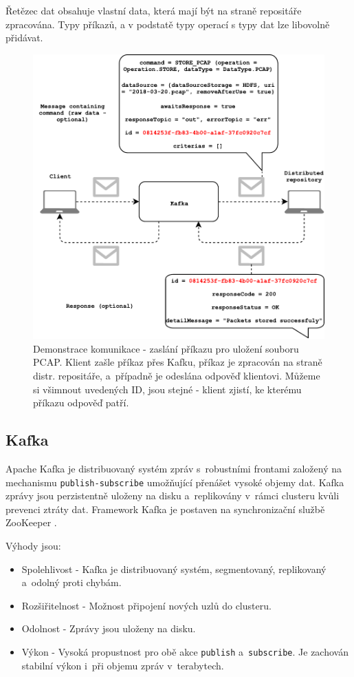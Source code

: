 \noindent Řetězec dat obsahuje vlastní data, která mají být na straně repositáře zpracována. Typy příkazů, a v podstatě typy operací s typy dat lze libovolně přidávat.

\begin{figure}[!h]
  \centering
  \includegraphics[width=14.1cm]{template-fig/Kafka_communication.pdf}
  \caption{Demonstrace komunikace - zaslání příkazu pro uložení souboru PCAP. Klient zašle příkaz přes Kafku, příkaz je zpracován na straně distr. repositáře, a~případně je odeslána odpověď klientovi. Můžeme si všimnout uvedených ID, jsou stejné - klient zjistí, ke kterému příkazu odpověď patří.}
  \label{FIG_KafkaCommunication}
\end{figure}

\subsection{Kafka}
Apache Kafka je distribuovaný systém zpráv s~robustními frontami založený na mechanismu \texttt{publish-subscribe} umožňující přenášet vysoké objemy dat. Kafka zprávy jsou perzistentně uloženy na disku a~replikovány v~rámci clusteru kvůli prevenci ztráty dat. Framework Kafka je postaven na synchronizační službě ZooKeeper \cite{kafkaTutorialsPoint}.

\vspace{0.5cm}
\noindent Výhody jsou:
\begin{itemize}
    \item Spolehlivost - Kafka je distribuovaný systém, segmentovaný, replikovaný a~odolný proti chybám.
    \item Rozšiřitelnost - Možnost připojení nových uzlů do clusteru.
    \item Odolnost - Zprávy jsou uloženy na disku.
    \item Výkon - Vysoká propustnost pro obě akce \texttt{publish} a~\texttt{subscribe}. Je zachován stabilní výkon i~při objemu zpráv v~terabytech.
\end{itemize}

